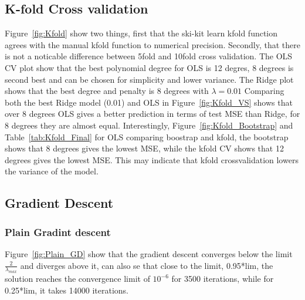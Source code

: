 \documentclass[aps,rmp,reprint,raggedbottom,amsmath,amssymb,longbibliography]{revtex4-1}
\begin{document}
\subsection{K-fold Cross validation}
Figure~\ref{fig:Kfold} show two things, first that the ski-kit learn kfold function agrees
with the manual kfold function to numerical precision. Secondly, that there is not a noticable
difference between 5fold and 10fold cross validation. The OLS CV plot
show that the best polynomial degree for OLS is 12 degres, 8 degrees is second best and can 
be chosen for simplicity and lower variance. The Ridge plot shows that the best degree and 
penalty is 8 degrees with $\lambda = 0.01$
Comparing both the best Ridge model (0.01) and OLS in Figure~\ref{fig:Kfold_VS} shows that
over 8 degrees OLS gives a better prediction in terms of test MSE than Ridge, for 8 degrees
they are almost equal. 
Interestingly, Figure~\ref{fig:Kfold_Bootstrap} and Table~\ref{tab:Kfold_Final} for OLS comparing boostrap and kfold, 
the bootstrap shows that 8 degrees gives the lowest MSE, while the kfold CV shows that 
12 degrees gives the lowest MSE. This may indicate that kfold crossvalidation lowers
the variance of the model. 

\subsection{Gradient Descent}
\subsubsection{Plain Gradint descent}
Figure~\ref{fig:Plain_GD} show that the gradient descent converges below the limit $\frac{2}{\lambda_{max}}$
and diverges above it, can also se that close to the limit, 0.95*lim, the solution reaches the convergence limit
of $10^{-6}$ for 3500 iterations, while for 0.25*lim, it takes 14000 iterations. 
\end{document}
